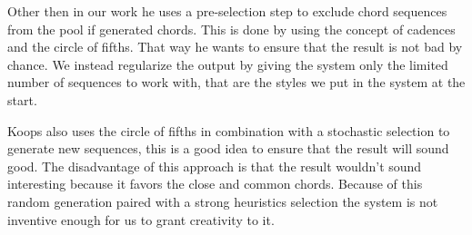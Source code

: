 Other then in our work he uses a pre-selection step to exclude chord sequences from the pool if generated chords. This is done by using the concept of cadences and the circle of fifths. That way he wants to ensure that the result is not bad by chance. We instead regularize the output by giving the system only the limited number of sequences to work with, that are the styles we put in the system at the start. 

Koops also uses the circle of fifths in combination with a stochastic selection to generate new sequences, this is a good idea to ensure that the result will sound good. The disadvantage of this approach is that the result wouldn't sound interesting because it favors the close and common chords. Because of this random generation paired with a strong heuristics selection the system is not inventive enough for us to grant creativity to it.





  